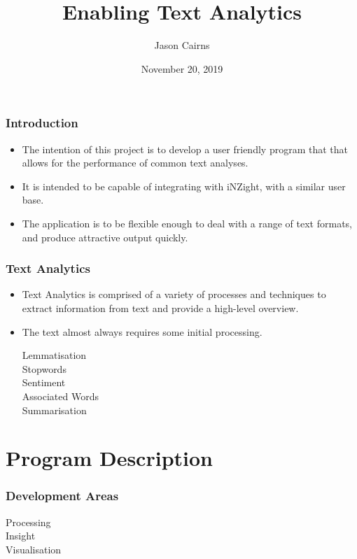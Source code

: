 \documentclass{beamer}
\title{Enabling Text Analytics}
\author{Jason Cairns}
\institute{University of Auckland}
\date{November 20, 2019}
\begin{document}
\maketitle{}

\begin{frame}
  \frametitle{Introduction}
  \begin{itemize}
  \item The intention of this project is to develop a user friendly
    program that that allows for the performance of common text analyses.
  \item It is intended to be capable of integrating with iNZight, with a
    similar user base.
  \item The application is to be flexible enough to deal with a range of
    text formats, and produce attractive output quickly.
  \end{itemize}
\end{frame}

\begin{frame}
  \frametitle{Text Analytics}
  \begin{itemize}
  \item Text Analytics is comprised of a variety of processes and techniques
to extract information from text and provide a high-level overview.
\item The text almost always requires some initial processing.
  \begin{description}
  \item[Lemmatisation]
  \item[Stopwords] 
  \item[Sentiment]
  \item[Associated Words]
  \item[Summarisation] 
  \end{description}
  \end{itemize}
\end{frame}

\section{Program Description}

\begin{frame}
  \frametitle{Development Areas}
  \begin{description}
  \item[Processing] 
  \item[Insight] 
  \item[Visualisation] 
  \end{description}
\end{frame}
\end{document}
